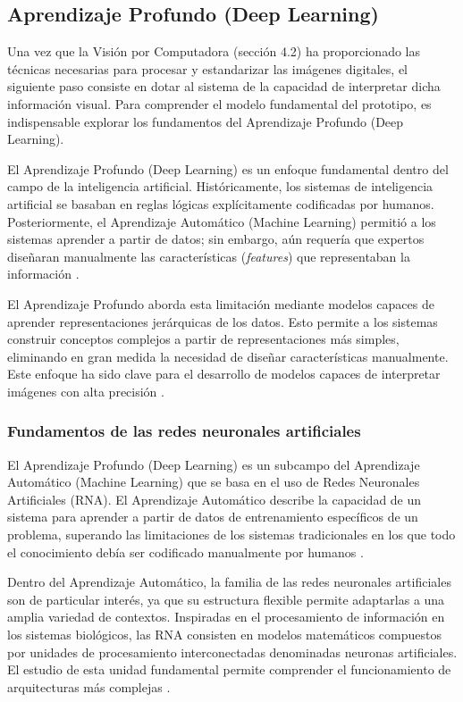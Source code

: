 	\subsection{Aprendizaje Profundo (Deep Learning)}
	
	Una vez que la Visión por Computadora (sección 4.2) ha proporcionado las técnicas necesarias para procesar y estandarizar las imágenes digitales, el siguiente paso consiste en dotar al sistema de la capacidad de interpretar dicha información visual. Para comprender el modelo fundamental del prototipo, es indispensable explorar los fundamentos del Aprendizaje Profundo (Deep Learning).
	
	El Aprendizaje Profundo (Deep Learning) es un enfoque fundamental dentro del campo de la inteligencia artificial. Históricamente, los sistemas de inteligencia artificial se basaban en reglas lógicas explícitamente codificadas por humanos. Posteriormente, el Aprendizaje Automático (Machine Learning) permitió a los sistemas aprender a partir de datos; sin embargo, aún requería que expertos diseñaran manualmente las características (\textit{features}) que representaban la información \cite{goodfellow2016dl}.
	
	El Aprendizaje Profundo aborda esta limitación mediante modelos capaces de aprender representaciones jerárquicas de los datos. Esto permite a los sistemas construir conceptos complejos a partir de representaciones más simples, eliminando en gran medida la necesidad de diseñar características manualmente. Este enfoque ha sido clave para el desarrollo de modelos capaces de interpretar imágenes con alta precisión \cite{goodfellow2016dl,geron2019}.
	
	\subsubsection{Fundamentos de las redes neuronales artificiales}
	
	El Aprendizaje Profundo (Deep Learning) es un subcampo del Aprendizaje Automático (Machine Learning) que se basa en el uso de Redes Neuronales Artificiales (RNA). El Aprendizaje Automático describe la capacidad de un sistema para aprender a partir de datos de entrenamiento específicos de un problema, superando las limitaciones de los sistemas tradicionales en los que todo el conocimiento debía ser codificado manualmente por humanos \cite{geron2019}.
	
	Dentro del Aprendizaje Automático, la familia de las redes neuronales artificiales son de particular interés, ya que su estructura flexible permite adaptarlas a una amplia variedad de contextos. Inspiradas en el procesamiento de información en los sistemas biológicos, las RNA consisten en modelos matemáticos compuestos por unidades de procesamiento interconectadas denominadas neuronas artificiales. El estudio de esta unidad fundamental permite comprender el funcionamiento de arquitecturas más complejas \cite{geron2019}.
	
